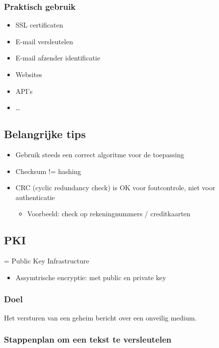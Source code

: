 \documentclass{article}
\begin{document}
\subsubsection{Praktisch gebruik}

\begin{itemize}
    \item SSL certificaten
    \item E-mail versleutelen
    \item E-mail afzender identificatie
    \item Websites
    \item API's
    \item \dots
\end{itemize}

\subsection{Belangrijke tips}

\begin{itemize}
    \item Gebruik steeds een correct algoritme voor de toepassing
    \item Checksum != hashing
    \item CRC (cyclic redundancy check) is OK voor foutcontrole, niet voor authenticatie
    \begin{itemize}
        \item Voorbeeld: check op rekeningnummers / creditkaarten
    \end{itemize} 
\end{itemize}

\subsection{PKI}

= Public Key Infrastructure

\begin{itemize}
    \item Assymtrische encryptie: met public en private key
\end{itemize}

\subsubsection{Doel}

Het versturen van een geheim bericht over een onveilig medium.

\subsubsection{Stappenplan om een tekst te versleutelen}
\end{document}
